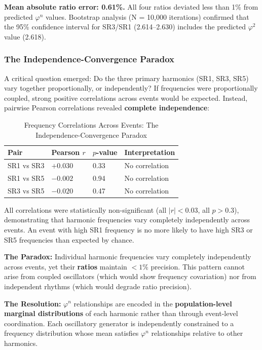 \documentclass[11pt,a4paper]{article}
\newcommand{\phisym}{\varphi}
\begin{document}
\textbf{Mean absolute ratio error: 0.61\%.} All four ratios deviated less than 1\% from predicted $\phisym^n$ values. Bootstrap analysis (N = 10,000 iterations) confirmed that the 95\% confidence interval for SR3/SR1 (2.614--2.630) includes the predicted $\phisym^2$ value (2.618).

\subsubsection{The Independence-Convergence Paradox}
A critical question emerged: Do the three primary harmonics (SR1, SR3, SR5) vary together proportionally, or independently? If frequencies were proportionally coupled, strong positive correlations across events would be expected. Instead, pairwise Pearson correlations revealed \textbf{complete independence}:

\begin{table}[H]
\centering
\caption{Frequency Correlations Across Events: The Independence-Convergence Paradox}
\label{tab:independence}
\begin{tabular}{llll}
\toprule
Pair & Pearson $r$ & $p$-value & Interpretation \\
\midrule
SR1 vs SR3 & $+0.030$ & 0.33 & No correlation \\
SR1 vs SR5 & $-0.002$ & 0.94 & No correlation \\
SR3 vs SR5 & $-0.020$ & 0.47 & No correlation \\
\bottomrule
\end{tabular}
\end{table}

All correlations were statistically non-significant (all $|r| < 0.03$, all $p > 0.3$), demonstrating that harmonic frequencies vary completely independently across events. An event with high SR1 frequency is no more likely to have high SR3 or SR5 frequencies than expected by chance.

\begin{keyinsight}
\textbf{The Paradox:} Individual harmonic frequencies vary completely independently across events, yet their \textbf{ratios} maintain $<1\%$ precision. This pattern cannot arise from coupled oscillators (which would show frequency covariation) nor from independent rhythms (which would degrade ratio precision).

\textbf{The Resolution:} $\phisym^n$ relationships are encoded in the \textbf{population-level marginal distributions} of each harmonic rather than through event-level coordination. Each oscillatory generator is independently constrained to a frequency distribution whose mean satisfies $\phisym^n$ relationships relative to other harmonics.
\end{keyinsight}
\end{document}
